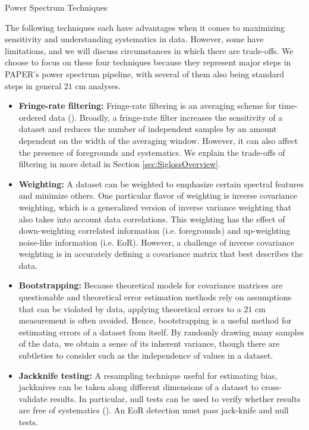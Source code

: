 \documentclass[preprint2,numberedappendix,tighten]{aastex6}  %
\begin{document}
\begin{center}
Power Spectrum Techniques
\end{center}

The following techniques each have advantages when it comes to maximizing sensitivity and understanding systematics in data. However, some have limitations, and we will discuss circumstances in which there are trade-offs. We choose to focus on these four techniques because they represent major steps in PAPER's power spectrum pipeline, with several of them also being standard steps in general $21$ cm analyses.
\begin{itemize}
\item \textbf{Fringe-rate filtering:} Fringe-rate filtering is an averaging scheme for time-ordered data (\citealt{parsons_et_al2016}). Broadly, a fringe-rate filter increases the sensitivity of a dataset and reduces the number of independent samples by an amount dependent on the width of the averaging window. However, it can also affect the presence of foregrounds and systematics. We explain the trade-offs of filtering in more detail in Section \ref{sec:SiglossOverview}.
\item \textbf{Weighting:} A dataset can be weighted to emphasize certain spectral features and minimize others. One particular flavor of weighting is inverse covariance weighting, which is a generalized version of inverse variance weighting that also takes into account data correlations. This weighting has the effect of down-weighting correlated information (i.e. foregrounds) and up-weighting noise-like information (i.e. EoR). However, a challenge of inverse covariance weighting is in accurately defining a covariance matrix that best describes the data. 
\item \textbf{Bootstrapping:} Because theoretical models for covariance matrices are questionable and theoretical error estimation methods rely on assumptions that can be violated by data, applying theoretical errors to a $21$ cm measurement is often avoided. Hence, bootstrapping is a useful method for estimating errors of a dataset from itself. By randomly drawing many samples of the data, we obtain a sense of its inherent variance, though there are subtleties to consider such as the independence of values in a dataset.
\item \textbf{Jackknife testing:} A resampling technique useful for estimating bias, jackknives can be taken along different dimensions of a dataset to cross-validate results. In particular, null tests can be used to verify whether results are free of systematics (\citealt{keating_et_al2016}). An EoR detection must pass jack-knife and null tests.
\end{itemize}
\end{document}
